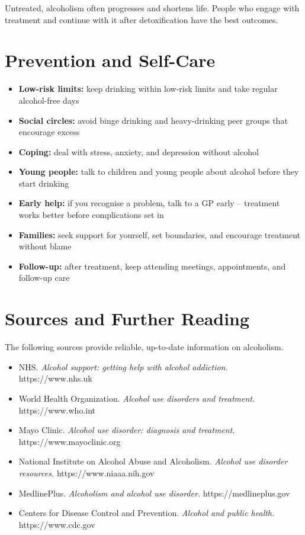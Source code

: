 Untreated, alcoholism often progresses and shortens life. People who engage with treatment and continue with it after detoxification have the best outcomes.

\section*{Prevention and Self-Care}
\begin{itemize}
    \item \textbf{Low-risk limits:} keep drinking within low-risk limits and take regular alcohol-free days
    \item \textbf{Social circles:} avoid binge drinking and heavy-drinking peer groups that encourage excess
    \item \textbf{Coping:} deal with stress, anxiety, and depression without alcohol
    \item \textbf{Young people:} talk to children and young people about alcohol before they start drinking
    \item \textbf{Early help:} if you recognise a problem, talk to a GP early -- treatment works better before complications set in
    \item \textbf{Families:} seek support for yourself, set boundaries, and encourage treatment without blame
    \item \textbf{Follow-up:} after treatment, keep attending meetings, appointments, and follow-up care
\end{itemize}

\section*{Sources and Further Reading}
The following sources provide reliable, up-to-date information on alcoholism.

\begin{itemize}
    \item NHS. \textit{Alcohol support: getting help with alcohol addiction.} https://www.nhs.uk
    \item World Health Organization. \textit{Alcohol use disorders and treatment.} https://www.who.int
    \item Mayo Clinic. \textit{Alcohol use disorder: diagnosis and treatment.} https://www.mayoclinic.org
    \item National Institute on Alcohol Abuse and Alcoholism. \textit{Alcohol use disorder resources.} https://www.niaaa.nih.gov
    \item MedlinePlus. \textit{Alcoholism and alcohol use disorder.} https://medlineplus.gov
    \item Centers for Disease Control and Prevention. \textit{Alcohol and public health.} https://www.cdc.gov
\end{itemize}
